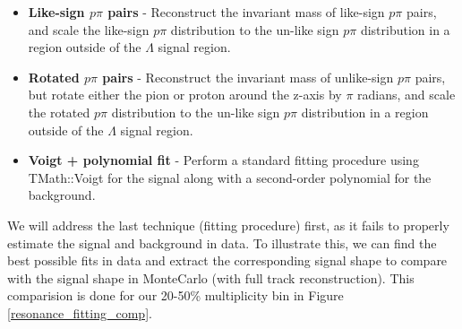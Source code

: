 \documentclass[ALICE,manyauthors]{ALICE_analysis_notes}
\begin{document}
 \begin{itemize}
	\item \textbf{Like-sign $p\pi$ pairs} - Reconstruct the invariant mass of like-sign $p\pi$ pairs, and scale the like-sign $p\pi$ distribution to the un-like sign $p\pi$ distribution in a region outside of the $\Lambda$ signal region.
	\item \textbf{Rotated $p\pi$ pairs} - Reconstruct the invariant mass of unlike-sign $p\pi$ pairs, but rotate either the pion or proton around the z-axis by $\pi$ radians, and scale the rotated $p\pi$ distribution to the un-like sign $p\pi$ distribution in a region outside of the $\Lambda$ signal region.
	\item \textbf{Voigt + polynomial fit} - Perform a standard fitting procedure using TMath::Voigt for the signal along with a second-order polynomial for the background.
 \end{itemize}

We will address the last technique (fitting procedure) first, as it fails to properly estimate the signal and background in data. To illustrate this, we can find the best possible fits in data and extract the corresponding signal shape to compare with the signal shape in MonteCarlo (with full track reconstruction). This comparision is done for our 20-50\% multiplicity bin in Figure \ref{resonance_fitting_comp}.
\end{document}
